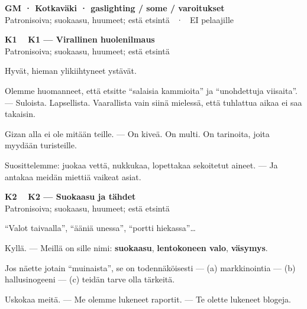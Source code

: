 \documentclass[a4paper,11pt]{article}
\begin{document}
\begin{center}
{\Large\bfseries GM · Kotkaväki · gaslighting / some / varoitukset}\\[0.1em]
{\small Patronisoiva; suokaasu, huumeet; estä etsintä \ · \ EI pelaajille}
\end{center}
\vspace{0.8mm}

\noindent
\begin{tcolorbox}[
  colframe=eaglecol,
  colback=white,
  boxrule=0.8pt,
  arc=0pt,
  outer arc=0pt,
  left=2.5mm, right=2.5mm, top=2mm, bottom=2mm,
  boxsep=0.5mm,
  sharp corners,
  enhanced,
  breakable=false
]
{\large\ttfamily\bfseries K1}~~
{\normalsize\bfseries K1 --- Virallinen huolenilmaus}\\[0.2em]
{\small\color{black!65} Patronisoiva; suokaasu, huumeet; estä etsintä}\\[0.35em]
{\normalsize\raggedright Hyvät, hieman ylikiihtyneet ystävät.

Olemme huomanneet, että etsitte ``salaisia kammioita'' ja ``unohdettuja viisaita''. --- Suloista. Lapsellista. Vaarallista vain siinä mielessä, että tuhlattua aikaa ei saa takaisin.

Gizan alla ei ole mitään teille. --- On kiveä. On multi. On tarinoita, joita myydään turisteille.

Suosittelemme: juokaa vettä, nukkukaa, lopettakaa sekoitetut aineet. --- Ja antakaa meidän miettiä vaikeat asiat.}
\end{tcolorbox}

\filbreak
\vspace{0.9mm}
\noindent
\begin{tcolorbox}[
  colframe=eaglecol,
  colback=white,
  boxrule=0.8pt,
  arc=0pt,
  outer arc=0pt,
  left=2.5mm, right=2.5mm, top=2mm, bottom=2mm,
  boxsep=0.5mm,
  sharp corners,
  enhanced,
  breakable=false
]
{\large\ttfamily\bfseries K2}~~
{\normalsize\bfseries K2 --- Suokaasu ja tähdet}\\[0.2em]
{\small\color{black!65} Patronisoiva; suokaasu, huumeet; estä etsintä}\\[0.35em]
{\normalsize\raggedright ``Valot taivaalla'', ``ääniä unessa'', ``portti hiekassa''\ldots{}

Kyllä. --- Meillä on sille nimi: \textbf{suokaasu}, \textbf{lentokoneen valo}, \textbf{väsymys}.

Jos näette jotain ``muinaista'', se on todennäköisesti --- (a) markkinointia --- (b) hallusinogeeni --- (c) teidän tarve olla tärkeitä.

Uskokaa meitä. --- Me olemme lukeneet raportit. --- Te olette lukeneet blogeja.}
\end{tcolorbox}
\end{document}
